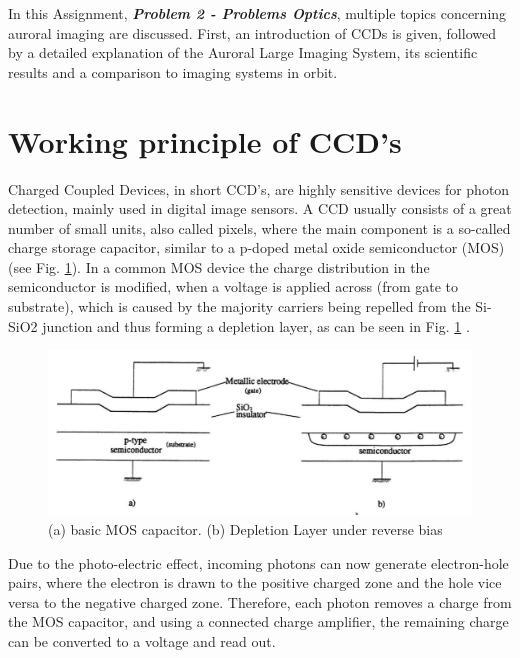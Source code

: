 

In this Assignment, \textit{\textbf{Problem 2 - Problems Optics}}, multiple topics concerning auroral imaging are discussed. First, an introduction of CCDs is given, followed by a detailed explanation of the Auroral Large Imaging System, its scientific results and a comparison to imaging systems in orbit.


\section{Working principle of CCD's}
Charged Coupled Devices, in short CCD's, are highly sensitive devices for photon detection, mainly used in digital image sensors. A CCD usually consists of a great number of small units, also called pixels, where the main component is a so-called charge storage capacitor, similar to a p-doped metal oxide semiconductor (MOS) (see Fig. \ref{fig:mos}).
In a common MOS device the charge distribution in the semiconductor is modified, when a voltage is applied across  (from gate to substrate), which is caused by the majority carriers being repelled from the Si-SiO2 junction and thus forming a depletion layer, as can be seen in Fig. \ref{fig:mos} \citep[c.f.][chap. 6.8.1]{hoymorksensors}.

\begin{figure}[!htbp]
	\centering
	\includegraphics[width=\linewidth]{images/mos}
		\caption{(a) basic MOS capacitor. (b) Depletion Layer under reverse bias \citep[c.f.][fig. 6.20]{hoymorksensors} }
		 \label{fig:mos}
\end{figure}

Due to the photo-electric effect, incoming photons can now generate electron-hole pairs, where the electron is drawn to the positive charged zone and the hole vice versa to the negative charged zone. Therefore, each photon removes a charge from the MOS capacitor, and using a connected charge amplifier, the remaining charge can be converted to a voltage and read out.

